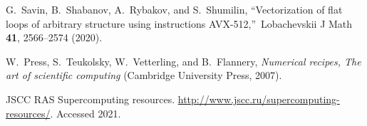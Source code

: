 \documentclass[
11pt,%
tightenlines,%
twoside,%
onecolumn,%
nofloats,%
nobibnotes,%
nofootinbib,%
superscriptaddress,%
noshowpacs,%
centertags]%
{revtex4}
\begin{document}
\begin{thebibliography}{99}
G.~Savin, B.~Shabanov, A.~Rybakov, and S.~Shumilin, \textquotedblleft Vectorization of flat loops of arbitrary structure using instructions AVX-512,\textquotedblright \ Lobachevskii J Math {\bf 41}, 2566--2574 (2020).

W.~Press, S.~Teukolsky, W.~Vetterling, and B.~Flannery, \emph{Numerical recipes, The art of scientific computing} (Cambridge University Press, 2007).

JSCC RAS Supercomputing resources. \url{http://www.jscc.ru/supercomputing-resources/}. Accessed 2021.

\end{thebibliography}
\end{document}
